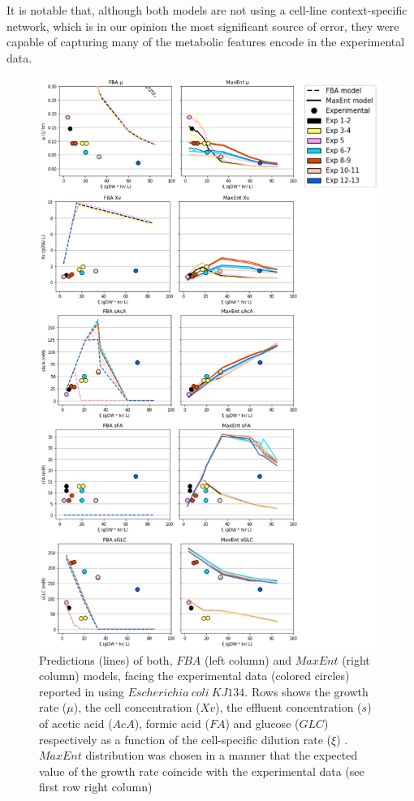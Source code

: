 \documentclass[]{article}
\begin{document}
	It is notable that, although both models are not using a cell-line context-specific network, which is in our opinion the most significant source of error, they were capable of capturing many of the metabolic features encode in the experimental data.
	
	\begin{figure}
		\centering
		\includegraphics[scale = 0.7]{plots_s_EColi}
		\caption{Predictions (lines) of both, $FBA$ (left column) and $MaxEnt$ (right column) models, facing the experimental data (colored circles) reported in \protect{} using $Escherichia\ coli\ KJ134$. Rows shows the growth rate ($\mu$), the cell concentration ($Xv$), the effluent concentration ($s$) of acetic acid ($AcA$), formic acid ($FA$) and glucose ($GLC$) respectively as a function of the cell-specific dilution rate ($\xi$) . $MaxEnt$ distribution was chosen in a manner that the expected value of the growth rate coincide with the experimental data (see first row right column)}
	\end{figure}
	
\end{document}
